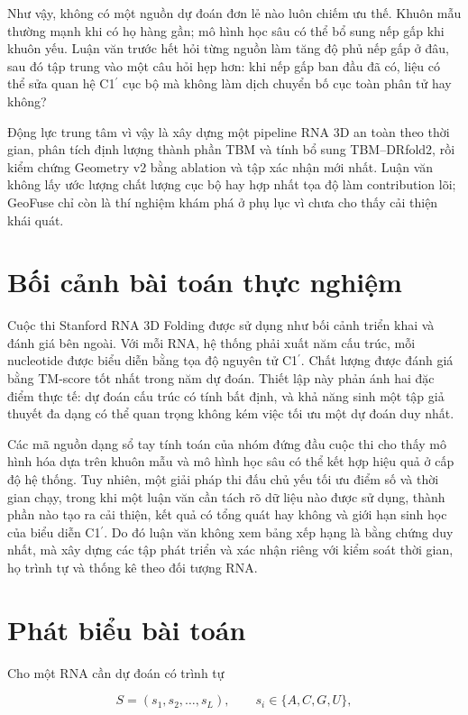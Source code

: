 \documentclass[12pt,a4paper,oneside]{report}
\newcommand{\cprime}{C1$^{\prime}$}
\begin{document}
Như vậy, không có một nguồn dự đoán đơn lẻ nào luôn chiếm ưu thế. Khuôn mẫu thường mạnh
khi có họ hàng gần; mô hình học sâu có thể bổ sung nếp gấp khi khuôn yếu. Luận văn trước
hết hỏi từng nguồn làm tăng độ phủ nếp gấp ở đâu, sau đó tập trung vào một câu hỏi hẹp
hơn: khi nếp gấp ban đầu đã có, liệu có thể sửa quan hệ \cprime{} cục bộ mà không làm
dịch chuyển bố cục toàn phân tử hay không?

Động lực trung tâm vì vậy là xây dựng một pipeline RNA 3D an toàn theo thời gian, phân
tích định lượng thành phần TBM và tính bổ sung TBM--DRfold2, rồi kiểm chứng Geometry v2
bằng ablation và tập xác nhận mới nhất. Luận văn không lấy ước lượng chất lượng cục bộ
hay hợp nhất tọa độ làm contribution lõi; GeoFuse chỉ còn là thí nghiệm khám phá ở phụ
lục vì chưa cho thấy cải thiện khái quát.

\section{Bối cảnh bài toán thực nghiệm}

Cuộc thi Stanford RNA 3D Folding \cite{kaggle_competition} được sử dụng như bối cảnh triển khai và đánh giá bên
ngoài. Với mỗi RNA, hệ thống phải xuất năm cấu trúc, mỗi nucleotide được biểu diễn bằng
tọa độ nguyên tử \cprime{}. Chất lượng được đánh giá bằng TM-score tốt nhất trong năm
dự đoán. Thiết lập này phản ánh hai đặc điểm thực tế: dự đoán cấu trúc có tính bất định,
và khả năng sinh một tập giả thuyết đa dạng có thể quan trọng không kém việc tối ưu một
dự đoán duy nhất.

Các mã nguồn dạng sổ tay tính toán của nhóm đứng đầu cuộc thi cho thấy mô hình hóa dựa trên khuôn mẫu và mô hình học
sâu có thể kết hợp hiệu quả ở cấp độ hệ thống. Tuy nhiên, một giải pháp thi đấu chủ yếu
tối ưu điểm số và thời gian chạy, trong khi một luận văn cần tách rõ dữ liệu nào được
sử dụng, thành phần nào tạo ra cải thiện, kết quả có tổng quát hay không và giới hạn
sinh học của biểu diễn \cprime{}. Do đó luận văn không xem bảng xếp hạng là bằng chứng
duy nhất, mà xây dựng các tập phát triển và xác nhận riêng với kiểm soát thời gian, họ
trình tự và thống kê theo đối tượng RNA.

\section{Phát biểu bài toán}

Cho một RNA cần dự đoán có trình tự

\begin{equation}
S=(s_1,s_2,\ldots,s_L),\qquad s_i\in\{A,C,G,U\},
\end{equation}
\end{document}
